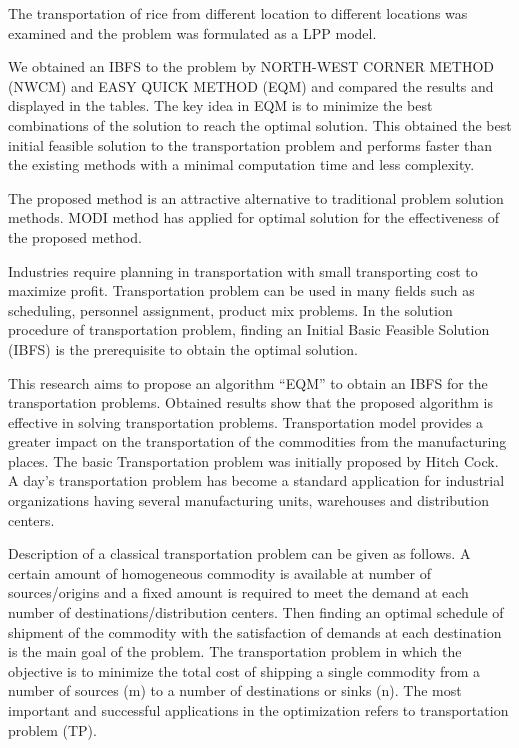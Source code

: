 \documentclass{article}
\begin{document}
{\large The transportation of rice from different location to different locations was examined and the problem was formulated as a LPP model.

We obtained an IBFS to the problem by NORTH-WEST
CORNER METHOD (NWCM) and EASY QUICK METHOD (EQM) and compared the results and displayed in the tables. The key idea in EQM is to minimize the best combinations of the solution to reach the optimal solution. This obtained the best initial feasible solution to the transportation problem and performs faster than the existing methods with a minimal computation time and less complexity.

The proposed method is an attractive alternative to traditional problem solution methods. MODI method has applied for optimal solution for the effectiveness of the proposed method.

Industries require planning in transportation with small transporting cost to maximize profit. Transportation problem can be used in many fields such as scheduling, personnel assignment, product mix problems. In the solution procedure of transportation problem, finding an Initial Basic Feasible Solution (IBFS) is the prerequisite to obtain the optimal solution.

This research aims to propose an algorithm “EQM” to obtain an IBFS for the transportation problems. Obtained results show that the proposed algorithm is effective in solving transportation problems. Transportation model provides a greater impact on the transportation of the commodities from the manufacturing places. The basic Transportation problem was initially proposed by Hitch Cock. A day’s transportation problem has become a standard application for industrial organizations having several manufacturing units, warehouses and distribution centers.

Description of a classical transportation problem can be given as follows. A certain amount of homogeneous commodity is available at number of sources/origins and a fixed amount is required to meet the demand at each number of destinations/distribution centers. Then finding an optimal schedule of shipment of the commodity with the satisfaction of demands at each destination is the main goal of the problem. The transportation problem in which the objective is to minimize the total cost of shipping a single commodity from a number of sources (m) to a number of destinations or sinks (n). The most important and successful applications in the optimization refers to transportation problem (TP).

}
\end{document}
